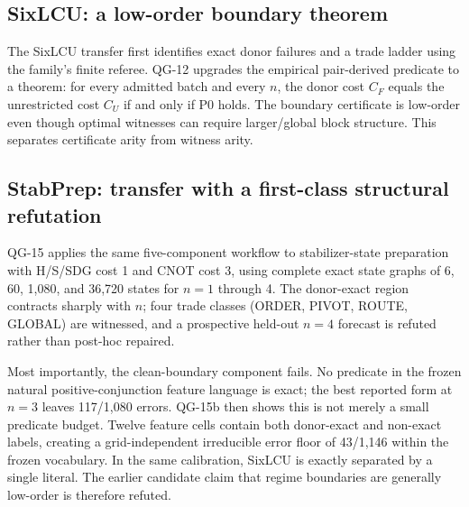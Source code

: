 \subsection{SixLCU: a low-order boundary theorem}
The SixLCU transfer first identifies exact donor failures and a trade ladder using the family's finite referee. QG-12 upgrades the empirical pair-derived predicate to a theorem: for every admitted batch and every $n$, the donor cost $C_F$ equals the unrestricted cost $C_U$ if and only if P0 holds. The boundary certificate is low-order even though optimal witnesses can require larger/global block structure. This separates certificate arity from witness arity.

\subsection{StabPrep: transfer with a first-class structural refutation}
QG-15 applies the same five-component workflow to stabilizer-state preparation with H/S/SDG cost 1 and CNOT cost 3, using complete exact state graphs of 6, 60, 1,080, and 36,720 states for $n=1$ through 4. The donor-exact region contracts sharply with $n$; four trade classes (ORDER, PIVOT, ROUTE, GLOBAL) are witnessed, and a prospective held-out $n=4$ forecast is refuted rather than post-hoc repaired.

Most importantly, the clean-boundary component fails. No predicate in the frozen natural positive-conjunction feature language is exact; the best reported form at $n=3$ leaves 117/1,080 errors. QG-15b then shows this is not merely a small predicate budget. Twelve feature cells contain both donor-exact and non-exact labels, creating a grid-independent irreducible error floor of 43/1,146 within the frozen vocabulary. In the same calibration, SixLCU is exactly separated by a single literal. The earlier candidate claim that regime boundaries are generally low-order is therefore refuted.